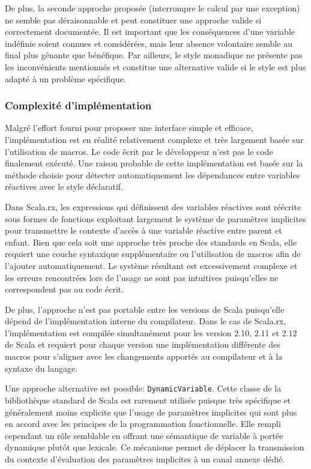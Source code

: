 De plus, la seconde approche proposée (interrompre le calcul par une exception) ne semble pas déraisonnable et peut constituer une approche valide si correctement documentée. Il est important que les conséquences d'une variable indéfinie soient connues et considérées, mais leur absence volontaire semble au final plus gênante que bénéfique. Par ailleurs, le style monadique ne présente pas les inconvénients mentionnés et constitue une alternative valide si le style est plus adapté à un problème spécifique.

\subsubsection{Complexité d'implémentation}

Malgré l'effort fourni pour proposer une interface simple et efficace, l'implémentation est en réalité relativement complexe et très largement basée sur l'utilisation de macros. Le code écrit par le développeur n'est pas le code finalement exécuté. Une raison probable de cette implémentation est basée sur la méthode choisie pour détecter automatiquement les dépendances entre variables réactives avec le style déclaratif.

Dans Scala.rx, les expressions qui définissent des variables réactives sont réécrite sous formes de fonctions exploitant largement le système de paramètres implicites pour transmettre le contexte d'accès à une variable réactive entre parent et enfant. Bien que cela soit une approche très proche des standards en Scala, elle requiert une couche syntaxique supplémentaire ou l'utilisation de macros afin de l'ajouter automatiquement. Le système résultant est excessivement complexe et les erreurs rencontrées lors de l'usage ne sont pas intuitives puisqu'elles ne correspondent pas au code écrit. 

De plus, l'approche n'est pas portable entre les versions de Scala puisqu'elle dépend de l'implémentation interne du compilateur. Dans le cas de Scala.rx, l'implémentation est compilée simultanément pour les version 2.10, 2.11 et 2.12 de Scala et requiert pour chaque version une implémentation différente des macros pour s'aligner avec les changements apportés au compilateur et à la syntaxe du langage.

Une approche alternative est possible: \texttt{DynamicVariable}. Cette classe de la bibliothèque standard de Scala est rarement utilisée puisque très spécifique et généralement moins explicite que l'usage de paramètres implicites qui sont plus en accord avec les principes de la programmation fonctionnelle. Elle rempli cependant un rôle semblable en offrant une sémantique de variable à portée dynamique plutôt que lexicale. Ce mécanisme permet de déplacer la transmission du contexte d'évaluation des paramètres implicites à un canal annexe dédié.

